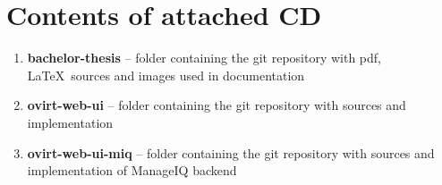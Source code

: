 \chapter{Contents of attached CD}
\begin{enumerate}
\item \textbf{bachelor-thesis} -- folder containing the git repository with pdf, \LaTeX ~sources and images used in documentation
\item \textbf{ovirt-web-ui} -- folder containing the git repository with sources and implementation
\item \textbf{ovirt-web-ui-miq} -- folder containing the git repository with sources and implementation of ManageIQ backend
\end{enumerate}
